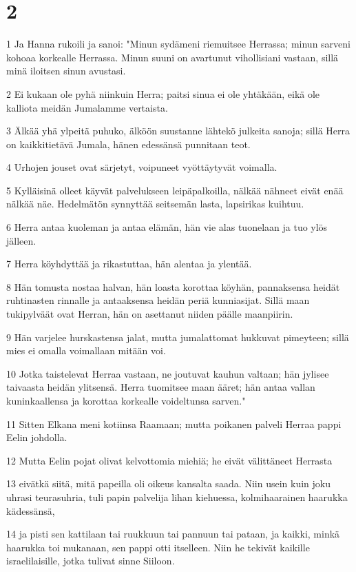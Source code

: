 \chapter{2}

\par 1 Ja Hanna rukoili ja sanoi: "Minun sydämeni riemuitsee Herrassa; minun sarveni kohoaa korkealle Herrassa. Minun suuni on avartunut vihollisiani vastaan, sillä minä iloitsen sinun avustasi.
\par 2 Ei kukaan ole pyhä niinkuin Herra; paitsi sinua ei ole yhtäkään, eikä ole kalliota meidän Jumalamme vertaista.
\par 3 Älkää yhä ylpeitä puhuko, älköön suustanne lähtekö julkeita sanoja; sillä Herra on kaikkitietävä Jumala, hänen edessänsä punnitaan teot.
\par 4 Urhojen jouset ovat särjetyt, voipuneet vyöttäytyvät voimalla.
\par 5 Kylläisinä olleet käyvät palvelukseen leipäpalkoilla, nälkää nähneet eivät enää nälkää näe. Hedelmätön synnyttää seitsemän lasta, lapsirikas kuihtuu.
\par 6 Herra antaa kuoleman ja antaa elämän, hän vie alas tuonelaan ja tuo ylös jälleen.
\par 7 Herra köyhdyttää ja rikastuttaa, hän alentaa ja ylentää.
\par 8 Hän tomusta nostaa halvan, hän loasta korottaa köyhän, pannaksensa heidät ruhtinasten rinnalle ja antaaksensa heidän periä kunniasijat. Sillä maan tukipylväät ovat Herran, hän on asettanut niiden päälle maanpiirin.
\par 9 Hän varjelee hurskastensa jalat, mutta jumalattomat hukkuvat pimeyteen; sillä mies ei omalla voimallaan mitään voi.
\par 10 Jotka taistelevat Herraa vastaan, ne joutuvat kauhun valtaan; hän jylisee taivaasta heidän ylitsensä. Herra tuomitsee maan ääret; hän antaa vallan kuninkaallensa ja korottaa korkealle voideltunsa sarven."
\par 11 Sitten Elkana meni kotiinsa Raamaan; mutta poikanen palveli Herraa pappi Eelin johdolla.
\par 12 Mutta Eelin pojat olivat kelvottomia miehiä; he eivät välittäneet Herrasta
\par 13 eivätkä siitä, mitä papeilla oli oikeus kansalta saada. Niin usein kuin joku uhrasi teurasuhria, tuli papin palvelija lihan kiehuessa, kolmihaarainen haarukka kädessänsä,
\par 14 ja pisti sen kattilaan tai ruukkuun tai pannuun tai pataan, ja kaikki, minkä haarukka toi mukanaan, sen pappi otti itselleen. Niin he tekivät kaikille israelilaisille, jotka tulivat sinne Siiloon.

